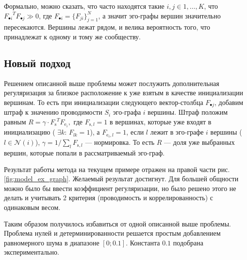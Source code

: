 \documentclass{ITaSconf}
\begin{document}
	
	Формально, можно сказать, что часто находятся такие $i,j \in {1,\dots, K}$, что ${F_{\bullet i}}^T F_{\bullet j} \gg 0$, где $F_{\bullet i} = \{F_{j i}\}_{j=1}^N$, а значит эго-графы вершин значительно пересекаются. 
	Вершины лежат рядом, и велика вероятность того, что принадлежат к одному и тому же сообществу.
	
	\subsection{Новый подход}
	
	Решением описанной выше проблемы может послужить дополнительная регуляризация за близкое расположение к уже взятым в качестве инициализации вершинам. 
	То есть при инициализации следующего вектор-столбца $F_{\bullet j}$, добавим штраф к значению проводимости $S_i$ эго-графа $i$ вершины. Штраф положим равным 
	$R = \gamma \cdot {F_{\mathrm{s}}}^T  F_{\mathrm{e}_i},$
	где $F_{\mathrm{s}, l} = 1$ в вершинах, которые уже входят в инициализацию ( $\exists k:\, F_{lk}=1 $),
	а $F_{\mathrm{e}_i, l} = 1$, если $l$ лежит в эго-графе $i$ вершины ($l \in \mathcal{N}(i)$),
	$\gamma = 1 / \sum_l F_{\mathrm{s}, l}$ --- нормировка. 
	То есть $R$ --- доля уже выбранных вершин, которые попали в рассматриваемый эго-граф.  
	
	Результат работы метода на текущем примере отражен на правой части рис. \ref{fig:model_ex_graph}. Желаемый результат достигнут. Для большей общности можно было бы ввести коэффициент регуляризации, но было решено этого не делать и учитывать 2 критерия (проводимость и коррелированность) с одинаковым весом. 
	
	Таким образом получилось избавиться от одной описанной выше проблемы. 
	Проблема нулей и детерминированности решается простым добавлением равномерного шума в диапазоне $[0; 0.1]$. Константа $0.1$ подобрана экспериментально. 
	
\end{document}
